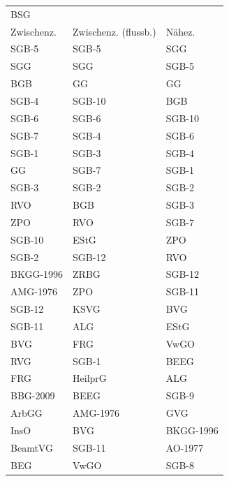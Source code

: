 \begin{tabular}{lll}
\toprule
\multicolumn{4}{l}{BSG} \\
Zwischenz. & Zwischenz. (flussb.) &    Nähez. \\
\midrule
     SGB-5 &                SGB-5 &       SGG \\
       SGG &                  SGG &     SGB-5 \\
       BGB &                   GG &        GG \\
     SGB-4 &               SGB-10 &       BGB \\
     SGB-6 &                SGB-6 &    SGB-10 \\
     SGB-7 &                SGB-4 &     SGB-6 \\
     SGB-1 &                SGB-3 &     SGB-4 \\
        GG &                SGB-7 &     SGB-1 \\
     SGB-3 &                SGB-2 &     SGB-2 \\
       RVO &                  BGB &     SGB-3 \\
       ZPO &                  RVO &     SGB-7 \\
    SGB-10 &                 EStG &       ZPO \\
     SGB-2 &               SGB-12 &       RVO \\
 BKGG-1996 &                 ZRBG &    SGB-12 \\
  AMG-1976 &                  ZPO &    SGB-11 \\
    SGB-12 &                 KSVG &       BVG \\
    SGB-11 &                  ALG &      EStG \\
       BVG &                  FRG &      VwGO \\
       RVG &                SGB-1 &      BEEG \\
       FRG &              HeilprG &       ALG \\
  BBG-2009 &                 BEEG &     SGB-9 \\
     ArbGG &             AMG-1976 &       GVG \\
      InsO &                  BVG & BKGG-1996 \\
   BeamtVG &               SGB-11 &   AO-1977 \\
       BEG &                 VwGO &     SGB-8 \\
\bottomrule
\end{tabular}

